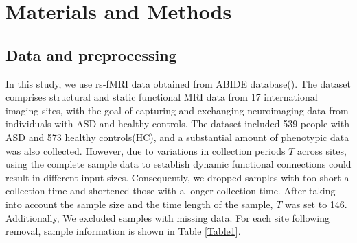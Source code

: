 \documentclass[a4paper]{cas-dc}
\begin{document}








\section{Materials and Methods}\label{Materials and Methods}
\subsection{Data and preprocessing}
In this study, we use rs-fMRI data obtained from ABIDE database(\cite{craddock2013neuro}). The dataset comprises structural and static functional MRI data from 17 international imaging sites, with the goal of capturing and exchanging neuroimaging data from individuals with ASD and healthy controls. The dataset included 539 people with ASD and 573 healthy controls(HC), and a substantial amount of phenotypic data was also collected. However, due to variations in collection periods $T$ across sites, using the complete sample data to establish dynamic functional connections could result in different input sizes. Consequently, we dropped samples with too short a collection time and shortened those with a longer collection time. After taking into account the sample size and the time length of the sample, $T$ was set to 146. Additionally, We excluded samples with missing data. For each site following removal, sample information is shown in Table \ref{Table1}.
\end{document}
